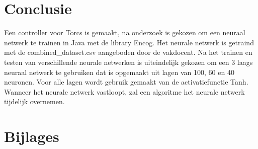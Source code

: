 \documentclass{article}
\begin{document}
\section{Conclusie}
Een controller voor Torcs is gemaakt, na onderzoek is gekozen om een neuraal netwerk te trainen in Java met de library Encog. Het neurale netwerk is getraind met de combined\_dataset.csv aangeboden door de vakdocent. Na het trainen en testen van verschillende neurale netwerken is uiteindelijk gekozen om een 3 laags neuraal netwerk te gebruiken dat is opgemaakt uit lagen van 100, 60 en 40 neuronen. Voor alle lagen wordt gebruik gemaakt van de activatiefunctie Tanh. Wanneer het neurale netwerk vastloopt, zal een algoritme het neurale netwerk tijdelijk overnemen.
\pagebreak
\section{Bijlages}
\end{document}
